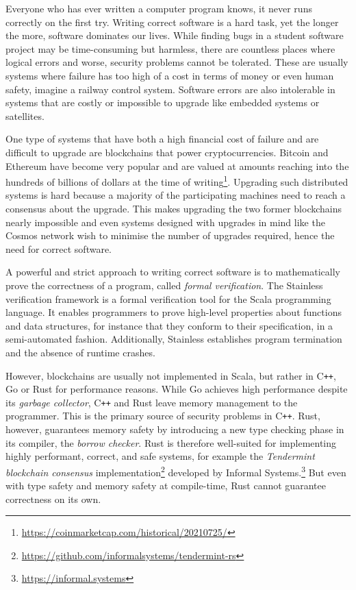 Everyone who has ever written a computer program knows, it never runs correctly
on the first try. Writing correct software is a hard task, yet the longer the
more, software dominates our lives. While finding bugs in a student software
project may be time-consuming but harmless, there are countless places where
logical errors and worse, security problems cannot be tolerated. These are
usually systems where failure has too high of a cost in terms of money or even
human safety, imagine a railway control system. Software errors are also
intolerable in systems that are costly or impossible to upgrade like embedded
systems or satellites.

One type of systems that have both a high financial cost of failure and are
difficult to upgrade are blockchains that power cryptocurrencies. Bitcoin
\cite{bitcoin} and Ethereum \cite{ethereum} have become very popular and are
valued at amounts reaching into the hundreds of billions of dollars at the time
of writing\footnote{\url{https://coinmarketcap.com/historical/20210725/}}.
Upgrading such distributed systems is hard because a majority of the
participating machines need to reach a consensus about the upgrade. This makes
upgrading the two former blockchains nearly impossible and even systems
designed with upgrades in mind like the Cosmos network \cite{cosmos} wish
to minimise the number of upgrades required, hence the need for correct
software.

A powerful and strict approach to writing correct software is to mathematically
prove the correctness of a program, called \emph{formal verification}. The
Stainless verification framework \cite{stainless} is a formal verification tool
for the Scala programming language. It enables programmers to prove high-level
properties about functions and data structures, for instance that they conform
to their specification, in a semi-automated fashion. Additionally, Stainless
establishes program termination and the absence of runtime crashes.

However, blockchains are usually not implemented in Scala, but rather in
C\texttt{++}, Go or Rust for performance reasons. While Go achieves high
performance despite its \emph{garbage collector}, C\texttt{++} and Rust leave
memory management to the programmer. This is the primary source of security
problems in C\texttt{++}. Rust, however, guarantees memory safety by introducing a
new type checking phase in its compiler, the \emph{borrow checker}. Rust is
therefore well-suited for implementing highly performant, correct, and safe
systems, for example the \emph{Tendermint blockchain consensus}
implementation\footnote{\url{https://github.com/informalsystems/tendermint-rs}}
developed by Informal Systems.\footnote{\url{https://informal.systems}} But even
with type safety and memory safety at compile-time, Rust cannot guarantee
correctness on its own.

